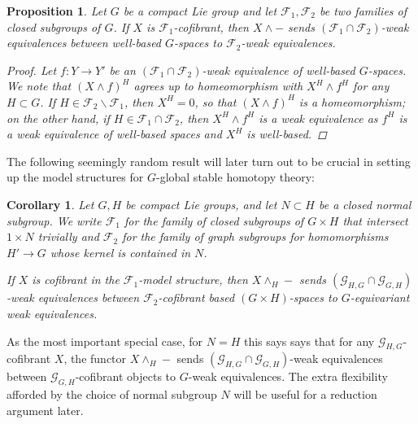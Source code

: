 \documentclass[reqno]{memo-l}
\theoremstyle{mythm}
\newtheorem{cor}[thm]{Corollary}
\newtheorem{prop}[thm]{Proposition}
\theoremstyle{definition}
\numberwithin{equation}{section}
\newcommand{\Ff}{{\mathcal{F}}}
\let\smashp=\wedge
\begin{document}
\begin{prop}\label{prop:smash-well-based}
    Let $G$ be a compact Lie group and let $\Ff_1,\Ff_2$ be two families of closed subgroups of $G$. If $X$ is $\Ff_1$-cofibrant, then $X\smashp-$ sends $(\Ff_1\cap\Ff_2)$-weak equivalences between well-based $G$-spaces to $\Ff_2$-weak equivalences.
    \begin{proof}
       Let $f\colon Y\to Y'$ be an $(\Ff_1\cap\Ff_2)$-weak equivalence of well-based $G$-spaces. We note that $(X\smashp f)^H$ agrees up to homeomorphism with $X^H\smashp f^H$ for any $H\subset G$. If $H\in\Ff_2\smallsetminus\Ff_1$, then $X^H=0$, so that $(X\smashp f)^H$ is a homeomorphism; on the other hand, if $H\in\Ff_1\cap\Ff_2$, then $X^H\smashp f^H$ is a weak equivalence as $f^H$ is a weak equivalence of well-based spaces and $X^H$ is well-based.
    \end{proof}
\end{prop}

The following seemingly random result will later turn out to be crucial in setting up the model structures for $G$-global stable homotopy theory:

\begin{cor}\label{cor:balanced-smash-product-oddly-specific}
    Let $G,H$ be compact Lie groups, and let $N\subset H$ be a closed normal subgroup. We write $\Ff_1$ for the family of closed subgroups of $G\times H$ that intersect $1\times N$ trivially and $\Ff_2$ for the family of graph subgroups for homomorphisms $H'\to G$ whose kernel is contained in $N$.
    
    If $X$ is cofibrant in the $\Ff_1$-model structure, then $X\smashp_H-$ sends $(\mathcal G_{H,G}\cap\mathcal G_{G,H})$-weak equivalences between $\Ff_2$-cofibrant based $(G\times H)$-spaces to $G$-equivariant weak equivalences.
\end{cor}

As the most important special case, for $N=H$ this says says that for any $\mathcal G_{H,G}$-cofibrant $X$, the functor $X\smashp_H-$ sends $(\mathcal G_{H,G}\cap\mathcal G_{G,H})$-weak equivalences between $\mathcal G_{G,H}$-cofibrant objects to $G$-weak equivalences. The extra flexibility afforded by the choice of normal subgroup $N$ will be useful for a reduction argument later.
\end{document}
